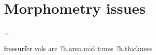 \chapter{Morphometry issues}
\setstretch{\lspac}

\ldots

freesurfer vols are ?h.area.mid times ?h.thickness